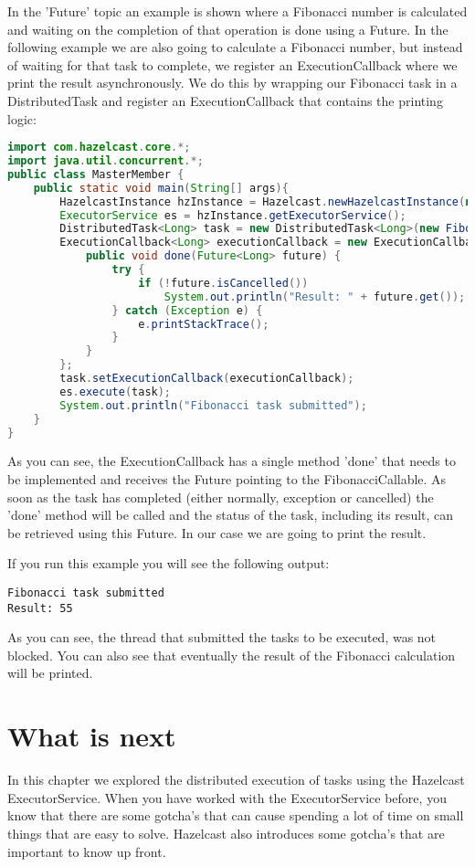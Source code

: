 In the 'Future' topic an example is shown where a Fibonacci number is calculated and waiting on the completion of that operation is done using a Future. In the following example we are also going to calculate a Fibonacci number, but instead of waiting for that task to complete, we register an ExecutionCallback where we print the result asynchronously. We do this by wrapping our Fibonacci task in a DistributedTask and register an ExecutionCallback that contains the printing logic:
\begin{lstlisting}[language=java]
import com.hazelcast.core.*;
import java.util.concurrent.*;
public class MasterMember {
    public static void main(String[] args){
        HazelcastInstance hzInstance = Hazelcast.newHazelcastInstance(null);
        ExecutorService es = hzInstance.getExecutorService();
        DistributedTask<Long> task = new DistributedTask<Long>(new FibonacciCallable(10));
        ExecutionCallback<Long> executionCallback = new ExecutionCallback<Long>() {
            public void done(Future<Long> future) {
                try {
                    if (!future.isCancelled()) 
                        System.out.println("Result: " + future.get());
                } catch (Exception e) {
                    e.printStackTrace();
                }
            }
        };
        task.setExecutionCallback(executionCallback);
        es.execute(task);
        System.out.println("Fibonacci task submitted");
    }
}
\end{lstlisting}
As you can see, the ExecutionCallback has a single method 'done' that needs to be implemented and receives the Future pointing to the FibonacciCallable. As soon as the task has completed (either normally, exception or cancelled) the 'done' method will be called and the status of the task, including its result, can be retrieved using this Future. In our case we are going to print the result.

If you run this example you will see the following output:
\begin{lstlisting}
Fibonacci task submitted
Result: 55
\end{lstlisting}
As you can see, the thread that submitted the tasks to be executed, was not blocked. You can also see that eventually the result of the Fibonacci calculation will be printed. 

\section{What is next}
In this chapter we explored the distributed execution of tasks using the Hazelcast ExecutorService. When you have worked with the ExecutorService before, you know that there are some gotcha's that can cause spending a lot of time on small things that are easy to solve. Hazelcast also introduces some gotcha's that are important to know up front.

